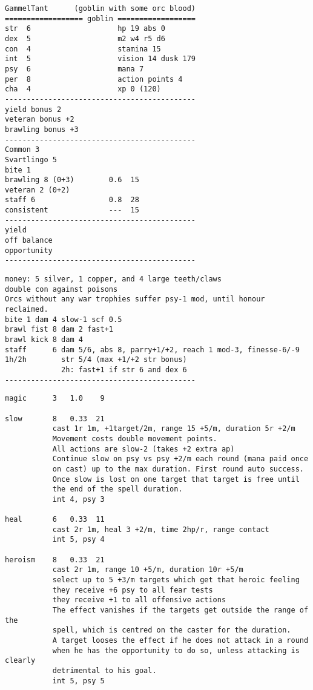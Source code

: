 \begin{verbatim}
\end{verbatim} \pagebreak[2] \begin{verbatim}
GammelTant      (goblin with some orc blood)
================== goblin ==================
str  6                    hp 19 abs 0
dex  5                    m2 w4 r5 d6
con  4                    stamina 15
int  5                    vision 14 dusk 179
psy  6                    mana 7
per  8                    action points 4
cha  4                    xp 0 (120)
--------------------------------------------
yield bonus 2
veteran bonus +2
brawling bonus +3
--------------------------------------------
Common 3
Svartlingo 5
bite 1
brawling 8 (0+3)        0.6  15
veteran 2 (0+2)
staff 6                 0.8  28
consistent              ---  15
--------------------------------------------
yield
off balance
opportunity
--------------------------------------------
\end{verbatim} \goodbreak \begin{verbatim}
money: 5 silver, 1 copper, and 4 large teeth/claws
double con against poisons
Orcs without any war trophies suffer psy-1 mod, until honour reclaimed.
bite 1 dam 4 slow-1 scf 0.5
brawl fist 8 dam 2 fast+1
brawl kick 8 dam 4
staff      6 dam 5/6, abs 8, parry+1/+2, reach 1 mod-3, finesse-6/-9
1h/2h        str 5/4 (max +1/+2 str bonus)
             2h: fast+1 if str 6 and dex 6
--------------------------------------------
\end{verbatim} \goodbreak \begin{verbatim}
magic      3   1.0    9

slow       8   0.33  21
           cast 1r 1m, +1target/2m, range 15 +5/m, duration 5r +2/m
           Movement costs double movement points.
           All actions are slow-2 (takes +2 extra ap)
           Continue slow on psy vs psy +2/m each round (mana paid once
           on cast) up to the max duration. First round auto success.
           Once slow is lost on one target that target is free until
           the end of the spell duration.
           int 4, psy 3

heal       6   0.33  11
           cast 2r 1m, heal 3 +2/m, time 2hp/r, range contact
           int 5, psy 4

heroism    8   0.33  21
           cast 2r 1m, range 10 +5/m, duration 10r +5/m
           select up to 5 +3/m targets which get that heroic feeling
           they receive +6 psy to all fear tests
           they receive +1 to all offensive actions
           The effect vanishes if the targets get outside the range of the
           spell, which is centred on the caster for the duration.
           A target looses the effect if he does not attack in a round
           when he has the opportunity to do so, unless attacking is clearly
           detrimental to his goal.
           int 5, psy 5





\end{verbatim}
